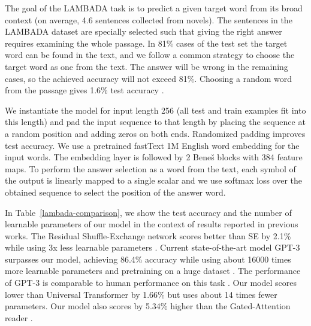 \documentclass[letterpaper]{article} %
\begin{document}
The goal of the LAMBADA task is to predict a given target word from its broad context (on average, 4.6 sentences collected from novels). The sentences in the LAMBADA dataset \citep{Paperno2016TheLD} are specially selected such that giving the right answer requires examining the whole passage. In 81\% cases of the test set the target word can be found in the text, and we follow a common strategy \citep{Chu_2017, dehghani2018universal} to choose the target word as one from the text. The answer will be wrong in the remaining cases, so the achieved accuracy will not exceed 81\%. Choosing a random word from the passage gives 1.6\% test accuracy \citep{Paperno2016TheLD}.

We instantiate the model for input length 256 (all test and train examples fit into this length) and pad the input sequence to that length by placing the sequence at a random position and adding zeros on both ends. Randomized padding improves test accuracy. We use a pretrained fastText 1M English word embedding \citep{mikolov2018advances} for the input words. The embedding layer is followed by 2 Bene\v{s} blocks with 384 feature maps. To perform the answer selection as a word from the text, each symbol of the output is linearly mapped to a single scalar and we use softmax loss over the obtained sequence to select the position of the answer word.

In Table~\ref{lambada-comparison}, we show the test accuracy and the number of learnable parameters of our model in the context of results reported in previous works. The Residual Shuffle-Exchange network scores better than SE by 2.1\% while using 3x less learnable parameters \citep{shuffle-exchange}. Current state-of-the-art model GPT-3 surpasses our model, achieving 86.4\% accuracy while using about 16000 times more learnable parameters and pretraining on a huge dataset \cite{brown2020language}. The performance of GPT-3 is comparable to human performance on this task \citep{Chu_2017}. Our model scores lower than Universal Transformer by 1.66\% \citep{dehghani2018universal} but uses about 14 times fewer parameters. Our model also scores by 5.34\% higher than the Gated-Attention reader \citep{Chu_2017}.
\end{document}
